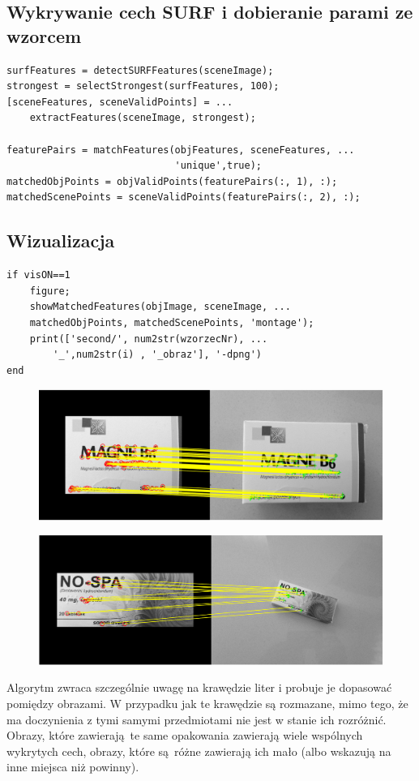 \documentclass[a4paper, 12pt, titlepage]{article}
\begin{document}
        \subsection{Wykrywanie cech SURF i dobieranie parami ze wzorcem}
\begin{lstlisting}
surfFeatures = detectSURFFeatures(sceneImage);
strongest = selectStrongest(surfFeatures, 100);
[sceneFeatures, sceneValidPoints] = ...
    extractFeatures(sceneImage, strongest);

featurePairs = matchFeatures(objFeatures, sceneFeatures, ...
                             'unique',true);
matchedObjPoints = objValidPoints(featurePairs(:, 1), :);
matchedScenePoints = sceneValidPoints(featurePairs(:, 2), :);
\end{lstlisting}
        \subsection{Wizualizacja}
\begin{lstlisting}
if visON==1
    figure;
    showMatchedFeatures(objImage, sceneImage, ...
    matchedObjPoints, matchedScenePoints, 'montage');
    print(['second/', num2str(wzorzecNr), ...
        '_',num2str(i) , '_obraz'], '-dpng')
end
\end{lstlisting}
            \begin{figure}[H]
                \centering
                \includegraphics[width=\linewidth]{second/1_1_obraz.png}
            \end{figure}
            \begin{figure}[H]
                \centering
                \includegraphics[width=\linewidth]{second/2_7_obraz.png}
            \end{figure}
            Algorytm zwraca szczególnie uwagę na krawędzie liter i probuje
            je dopasować pomiędzy obrazami. W przypadku jak te krawędzie są
            rozmazane, mimo tego, że ma doczynienia z tymi samymi 
            przedmiotami nie jest w stanie ich rozróżnić. Obrazy, które
            zawierają te same opakowania zawierają wiele wspólnych wykrytych
            cech, obrazy, które są różne zawierają ich mało (albo wskazują
            na inne miejsca niż powinny).
\end{document}
